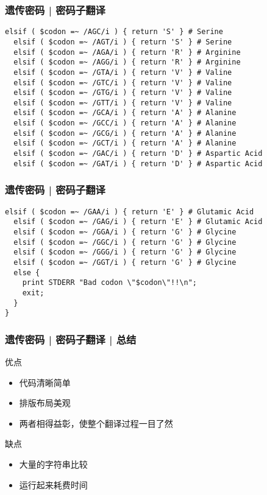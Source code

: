 \begin{frame}[fragile]
  \frametitle{遗传密码 | 密码子翻译}
\begin{lstlisting}[firstnumber=52,basicstyle=\footnotesize\tt,numberstyle=\scriptsize]
  elsif ( $codon =~ /AGC/i ) { return 'S' } # Serine
  elsif ( $codon =~ /AGT/i ) { return 'S' } # Serine
  elsif ( $codon =~ /AGA/i ) { return 'R' } # Arginine
  elsif ( $codon =~ /AGG/i ) { return 'R' } # Arginine
  elsif ( $codon =~ /GTA/i ) { return 'V' } # Valine
  elsif ( $codon =~ /GTC/i ) { return 'V' } # Valine
  elsif ( $codon =~ /GTG/i ) { return 'V' } # Valine
  elsif ( $codon =~ /GTT/i ) { return 'V' } # Valine
  elsif ( $codon =~ /GCA/i ) { return 'A' } # Alanine
  elsif ( $codon =~ /GCC/i ) { return 'A' } # Alanine
  elsif ( $codon =~ /GCG/i ) { return 'A' } # Alanine
  elsif ( $codon =~ /GCT/i ) { return 'A' } # Alanine
  elsif ( $codon =~ /GAC/i ) { return 'D' } # Aspartic Acid
  elsif ( $codon =~ /GAT/i ) { return 'D' } # Aspartic Acid
\end{lstlisting}
\end{frame}

\begin{frame}[fragile]
  \frametitle{遗传密码 | 密码子翻译}
\begin{lstlisting}[firstnumber=66,basicstyle=\footnotesize\tt,numberstyle=\scriptsize]
  elsif ( $codon =~ /GAA/i ) { return 'E' } # Glutamic Acid
  elsif ( $codon =~ /GAG/i ) { return 'E' } # Glutamic Acid
  elsif ( $codon =~ /GGA/i ) { return 'G' } # Glycine
  elsif ( $codon =~ /GGC/i ) { return 'G' } # Glycine
  elsif ( $codon =~ /GGG/i ) { return 'G' } # Glycine
  elsif ( $codon =~ /GGT/i ) { return 'G' } # Glycine
  else {
    print STDERR "Bad codon \"$codon\"!!\n";
    exit;
  }
}
\end{lstlisting}
\end{frame}

\begin{frame}
  \frametitle{遗传密码 | 密码子翻译 | 总结}
  \begin{block}{优点}
    \begin{itemize}
      \item 代码清晰简单
      \item 排版布局美观
      \item 两者相得益彰，使整个翻译过程一目了然
    \end{itemize}
  \end{block}
  \pause
  \begin{block}{缺点}
    \begin{itemize}
      \item 大量的字符串比较
      \item 运行起来耗费时间
    \end{itemize}
  \end{block}
\end{frame}

